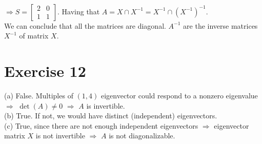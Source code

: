 \documentclass{article}
\begin{document}
\\
$\Rightarrow S = \begin{bmatrix}
2 & 0  \\
1 & 1  
\end{bmatrix}$.
Having that $A = X \cap X^{-1} = X^{-1} \cap (X^{-1})^{-1}.$
\\ We can conclude that all the matrices are diagonal. $A^{-1}$ are the inverse matrices $X^{-1}$ of matrix $X$.
\section{Exercise 12}
(a) False. Multiples of $(1,4)$ eigenvector could respond to a nonzero eigenvalue $\Rightarrow$ $\det(A) \neq 0$ $\Rightarrow$ $A$ is invertible.
\\
(b) True. If not, we would have distinct (independent) eigenvectors.
\\
(c) True, since there are not enough independent eigenvectors $\Rightarrow$ eigenvector matrix $X$ is not invertible $\Rightarrow$ $A$ is not diagonalizable.
\end{document}
